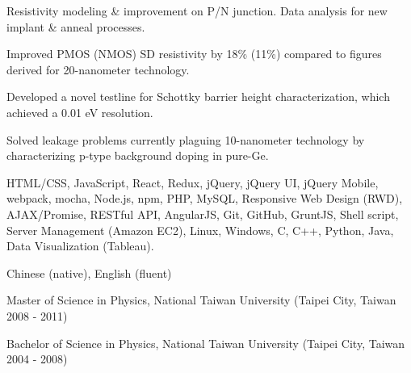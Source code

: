 \documentclass[10pt, a4paper]{puredoc-cv}
\begin{document}
\begin{skipwrapper}
  \begin{cvitems}
    \item {Resistivity modeling \& improvement on P/N junction. Data analysis for new implant \& anneal processes.}
    \item {Improved PMOS (NMOS) SD resistivity by 18\% (11\%) compared to figures derived for 20-nanometer technology.}
    \item {Developed a novel testline for Schottky barrier height characterization, which achieved a 0.01 eV resolution.}
    \item {Solved leakage problems currently plaguing 10-nanometer technology by characterizing p-type background doping in pure-Ge.}
  \end{cvitems}
\end{skipwrapper}
\begin{skipwrapper}
  \begin{cvitems}
    \item {HTML/CSS, JavaScript, React, Redux, jQuery, jQuery UI, jQuery Mobile, webpack, mocha, Node.js, npm, PHP, MySQL, Responsive Web Design (RWD), AJAX/Promise, RESTful API, AngularJS, Git, GitHub, GruntJS, Shell script, Server Management (Amazon EC2), Linux, Windows, C, C++, Python, Java, Data Visualization (Tableau).}
  \end{cvitems}
\end{skipwrapper}
\begin{skipwrapper}
  \begin{cvitems}
    \item {Chinese (native), English (fluent)}
  \end{cvitems}
\end{skipwrapper}
\begin{skipwrapper}
  \begin{cvitems}
    \item {Master of Science in Physics, National Taiwan University (Taipei City, Taiwan \textbar{} 2008 - 2011)}
    \item {Bachelor of Science in Physics, National Taiwan University (Taipei City, Taiwan \textbar{} 2004 - 2008)}
  \end{cvitems}
\end{skipwrapper}
\end{document}
